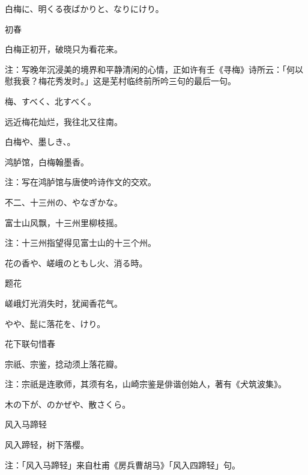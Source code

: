 \begin{haiku}
    {\FH 白梅に、明くる夜ばかりと、なりにけり。}

    {\FK 初春}

    {\FK 白梅正初开，破晓只为看花来。}

    {\FT 注：写晚年沉浸美的境界和平静清闲的心情，正如许有壬《寻梅》诗所云：「何以慰我衰？梅花秀发时。」这是芜村临终前所吟三句的最后一句。}
\end{haiku}

\begin{haiku}
    {\FH 梅、すべく、北すべく。}

    {\FK 远近梅花灿烂，我往北又往南。}
\end{haiku}

\begin{haiku}
    {\FH 白梅や、墨しき、。}

    {\FK 鸿胪馆，白梅翰墨香。}

    {\FT 注：写在鸿胪馆与唐使吟诗作文的交欢。}
\end{haiku}

\begin{haiku}
    {\FH 不二、十三州の、やなぎかな。}

    {\FK 富士山风飘，十三州里柳枝摇。}

    {\FT 注：十三州指望得见富士山的十三个州。}
\end{haiku}

\begin{haiku}
    {\FH 花の香や、嵯峨のともし火、消る時。}

    {\FK 题花}

    {\FK 嵯峨灯光消失时，犹闻香花气。}
\end{haiku}

\begin{haiku}
    {\FH {}やや、髭に落花を、けり。}

    {\FK 花下联句惜春}

    {\FK 宗祇、宗鉴，捻动须上落花瓣。}

    {\FT 注：宗祇是连歌师，其须有名，山崎宗鉴是俳谐创始人，著有《犬筑波集》。}
\end{haiku}

\begin{haiku}
    {\FH 木の下が、のかぜや、散さくら。}

    {\FK 风入马蹄轻}

    {\FK 风入蹄轻，树下落樱。}

    {\FT 注：「风入马蹄轻」来自杜甫《房兵曹胡马》「风入四蹄轻」句。}
\end{haiku}


